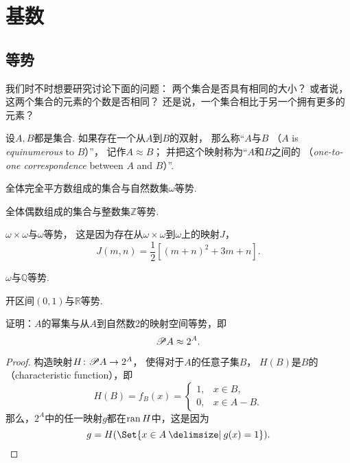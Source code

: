 \section{基数}
\subsection{等势}
我们时不时想要研究讨论下面的问题：
两个集合是否具有相同的大小？
或者说，这两个集合的元素的个数是否相同？
还是说，一个集合相比于另一个拥有更多的元素？

\begin{definition}
设\(A,B\)都是集合.
如果存在一个从\(A\)到\(B\)的双射，
那么称“\(A\)与\(B\) （\(A\) is \emph{equinumerous} to \(B\)）”，
记作\(A \approx B\)；
并把这个映射称为“\(A\)和\(B\)之间的%
（\emph{one-to-one correspondence} between \(A\) and \(B\)）”.
\end{definition}

\begin{example}
全体完全平方数组成的集合与自然数集\(\omega\)等势.
\end{example}

\begin{example}
全体偶数组成的集合与整数集\(\mathbb{Z}\)等势.
\end{example}

\begin{example}
\(\omega\times\omega\)与\(\omega\)等势，
这是因为存在从\(\omega\times\omega\)到\(\omega\)上的映射\(J\)，
\[
	J(m,n) = \frac{1}{2} [(m+n)^2+3m+n].
\]
\end{example}

\begin{example}
\(\omega\)与\(\mathbb{Q}\)等势.
\end{example}

\begin{example}
开区间\((0,1)\)与\(\mathbb{R}\)等势.
\end{example}

\begin{example}
证明：\(A\)的幂集与从\(A\)到自然数\(2\)的映射空间等势，即\begin{equation}
	\mathscr{P} A \approx 2^A.
\end{equation}
\begin{proof}
构造映射\(H\colon \mathscr{P} A \to 2^A\)，
使得对于\(A\)的任意子集\(B\)，
\(H(B)\)是\(B\)的（characteristic function），即\[
	H(B) = f_B(x) = \left\{ \begin{array}{cl}
		1, & x \in B, \\
		0, & x \in A - B.
	\end{array} \right.
\]
那么，\(2^A\)中的任一映射\(g\)都在\(\operatorname{ran} H\)中，这是因为\[
	g = H(\Set{ x \in A \given g(x) = 1 }).
	\qedhere
\]
\end{proof}
\end{example}

